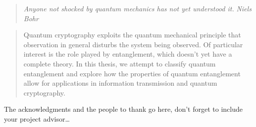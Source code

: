 \documentclass[
11pt,
english, %
doublespacing,
liststotoc, %
headsepline, %
openany
]{MastersDoctoralThesis} %
\begin{document}

\vspace*{0.2\textheight}

\begin{quote}
\textit{Anyone not shocked by quantum mechanics has not yet understood it.}
\bigbreak
\hfill \textit{Niels Bohr}
\end{quote}


\begin{abstract}
\addchaptertocentry{\abstractname} %
Quantum cryptography exploits the quantum mechanical principle that observation in general disturbs the system being observed. Of particular interest is the role played by entanglement, which doesn't yet have a complete theory. In this thesis, we attempt to classify quantum entanglement and explore how the properties of quantum entanglement allow for applications in information transmission and quantum cryptography.
\end{abstract}


\begin{acknowledgements}
\addchaptertocentry{\acknowledgementname} %
The acknowledgments and the people to thank go here, don't forget to include your project advisor\ldots
\end{acknowledgements}


\tableofcontents %


\end{document}
